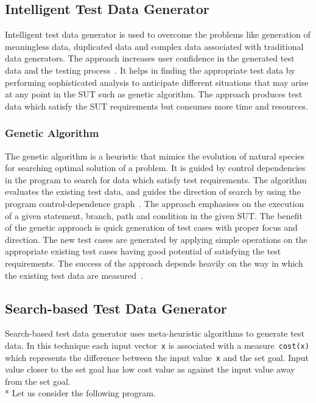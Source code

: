 

\subsection{Intelligent Test Data Generator}
\label{sec:intelligent_2}
Intelligent test data generator is used to overcome the problems like generation of meaningless data, duplicated data and complex data associated with traditional data generators. The approach increases user confidence in the generated test data and the testing process~\cite{ramamoorthy1975testing}. It helps in finding the appropriate test data by performing sophisticated analysis to anticipate different situations that may arise at any point in the SUT such as genetic algorithm. The approach produces test data which satisfy the SUT requirements but consumes more time and resources.

\subsubsection{Genetic Algorithm}
The genetic algorithm is a heuristic that mimics the evolution of natural species for searching optimal solution of a problem. It is guided by control dependencies in the program to search for data which satisfy test requirements. The algorithm evaluates the existing test data, and guides the direction of search by using the program control-dependence graph~\cite{pargas1999test}. The approach emphasises on the execution of a given statement, branch, path and condition in the given SUT. The benefit of the genetic approach is quick generation of test cases with proper focus and direction. The new test cases are generated by applying simple operations on the appropriate existing test cases having good potential of satisfying the test requirements. The success of the approach depends heavily on the way in which the existing test data are measured~\cite{pargas1999test}.


\subsection{Search-based Test Data Generator} \label{sec:search_based_2}
Search-based test data generator uses meta-heuristic algorithms to generate test data. In this technique each input vector~\verb+x+ is associated with a measure~\verb+cost(x)+ which represents the difference between the input value~\verb+x+ and the set goal. Input value closer to the set goal has low cost value as against the input value away from the set goal. \\*
Let us consider the following program.
\bigskip
\bigskip

